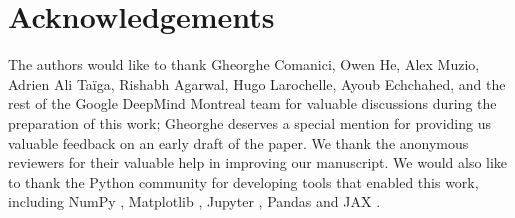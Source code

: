 \section*{Acknowledgements}
The authors would like to thank Gheorghe Comanici, Owen He, Alex Muzio, Adrien Ali Ta\"{i}ga, Rishabh Agarwal, Hugo Larochelle, Ayoub Echchahed, and the rest of the Google DeepMind Montreal team for valuable discussions during the preparation of this work; Gheorghe deserves a special mention for providing us valuable feedback on an early draft of the paper. We thank the anonymous reviewers for their valuable help in improving our manuscript. We would also like to thank the Python community \citep{van1995python, 4160250} for developing tools that enabled this work, including NumPy \cite{harris2020array}, Matplotlib \cite{hunter2007matplotlib}, Jupyter \cite{2016ppap}, Pandas \cite{McKinney2013Python} and JAX \cite{bradbury2018jax}.